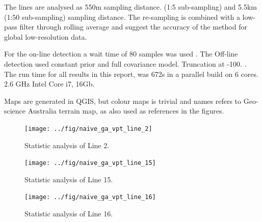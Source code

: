 The lines are analysed as 550m sampling distance. (1:5 sub-sampling) and 5.5km (1:50 sub-sampling) sampling distance. The re-sampling is combined with a low-pass filter through rolling average and suggest the accuracy of the method for global low-resolution data. 

For the on-line detection a wait time of 80 samples was used \cite{Adams2007}. The Off-line detection used constant prior and full covariance model. Truncation at -100. \cite{Xuan2011,Xuan2007,Fearnhead2006}. \\

The run time for all results in this report, was 672s  in a parallel build on 6 cores. 2.6 GHz Intel Core i7, 16Gb. 

Maps are generated in QGIS, but colour maps is trivial and names refers to Geo-science Australia terrain map, as also used as references in the figures. 

\begingroup
\let\clearpage\relax
\listoffigures
\endgroup

\begin{figure}[h]
	\centering
	\texttt{[image: ../fig/naive\_ga\_vpt\_line\_2]}
	\caption[Naïve 2]{Statistic analysis of Line 2. }
	\label{fig:naive2}
\end{figure}


\begin{figure}[h]
	\centering
	\texttt{[image: ../fig/naive\_ga\_vpt\_line\_15]}
	\caption[Naïve 15]{Statistic analysis of Line 15. }
	\label{fig:naive15}
\end{figure}

\begin{figure}[h]
	\centering
	\texttt{[image: ../fig/naive\_ga\_vpt\_line\_16]}
	\caption[Naïve 16]{Statistic analysis of Line 16. }
	\label{fig:naive16}
\end{figure}

